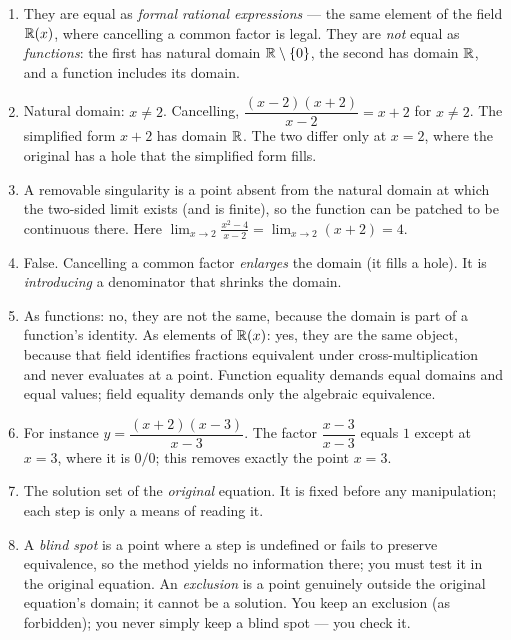 \documentclass{essay}
\begin{document}
\begin{enumerate}

  \item They are equal as \emph{formal rational expressions} --- the same element of the field
    $\mathbb{R}(x)$, where cancelling a common factor is legal. They are \emph{not} equal as
    \emph{functions}: the first has natural domain $\mathbb{R}\setminus\{0\}$, the second has
    domain $\mathbb{R}$, and a function includes its domain.

  \item Natural domain: $x \neq 2$. Cancelling, $\dfrac{(x-2)(x+2)}{x-2} = x+2$ for $x \neq 2$.
    The simplified form $x+2$ has domain $\mathbb{R}$. The two differ only at $x=2$, where the
    original has a hole that the simplified form fills.

  \item A removable singularity is a point absent from the natural domain at which the
    two-sided limit exists (and is finite), so the function can be patched to be continuous
    there. Here $\displaystyle\lim_{x\to2}\frac{x^2-4}{x-2} = \lim_{x\to2}(x+2) = 4$.

  \item False. Cancelling a common factor \emph{enlarges} the domain (it fills a hole). It is
    \emph{introducing} a denominator that shrinks the domain.

  \item As functions: no, they are not the same, because the domain is part of a function's
    identity. As elements of $\mathbb{R}(x)$: yes, they are the same object, because that field
    identifies fractions equivalent under cross-multiplication and never evaluates at a point.
    Function equality demands equal domains and equal values; field equality demands only the
    algebraic equivalence.

  \item For instance $y = \dfrac{(x+2)(x-3)}{x-3}$. The factor $\dfrac{x-3}{x-3}$ equals $1$
    except at $x=3$, where it is $0/0$; this removes exactly the point $x=3$.

  \item The solution set of the \emph{original} equation. It is fixed before any manipulation;
    each step is only a means of reading it.

  \item A \emph{blind spot} is a point where a step is undefined or fails to preserve
    equivalence, so the method yields no information there; you must test it in the original
    equation. An \emph{exclusion} is a point genuinely outside the original equation's domain;
    it cannot be a solution. You keep an exclusion (as forbidden); you never simply keep a blind
    spot --- you check it.


\end{enumerate}
\end{document}
